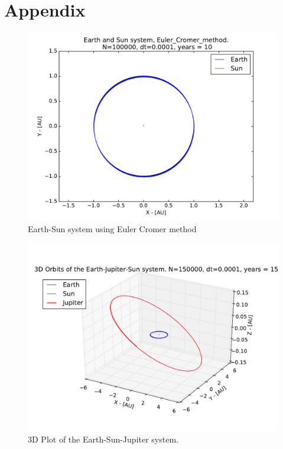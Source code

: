 \documentclass[12pt]{article}
\begin{document}
\section*{Appendix}
\begin{figure}[!h]
\centering
\includegraphics[width=\linewidth]{Plots/Earth_Sun_Euler_Cromer_method.pdf}
\caption{Earth-Sun system using Euler Cromer method}
\label{fig:Appendix_EulerCromer}
\end{figure}


\begin{figure}[!h]
\centering
\includegraphics[width=\linewidth]{Plots/Earth_Sun_Jupiter_3D.pdf}
\caption{3D Plot of the Earth-Sun-Jupiter system.}
\label{fig:Appendix_3D_ESJ}
\end{figure}
\end{document}
